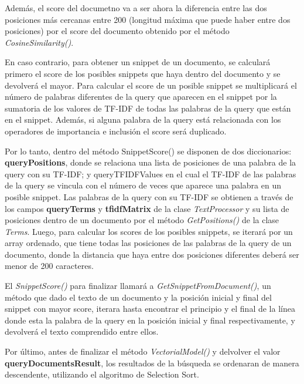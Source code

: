 \documentclass[a4paper,12pt]{report}
\begin{document}
Además, el score del documetno va a ser ahora la diferencia entre las dos posiciones más cercanas
entre 200 (longitud máxima que puede haber entre dos posiciones) por el score del documento
obtenido por el método \textit{CosineSimilarity()}.

En caso contrario, para obtener un snippet de un documento, se calculará primero el score de los
posibles snippets que haya dentro del documento y se devolverá el mayor. Para calcular el score de
un posible snippet se multiplicará el número de palabras diferentes de la query que aparecen en el
snippet por la sumatoria de los valores de TF-IDF de todas las palabras de la query que están en el
snippet. Además, si alguna palabra de la query está relacionada con los operadores de importancia e
inclusión el score será duplicado.

Por lo tanto, dentro del método SnippetScore() se disponen de dos diccionarios: \textbf{queryPositions},
donde se relaciona una lista de posiciones de una palabra de la query con su TF-IDF; y
queryTFIDFValues en el cual el TF-IDF de las palabras de la query se vincula con el número de veces
que aparece una palabra en un posible snippet. Las palabras de la query con su TF-IDF se obtienen a
través de los campos \textbf{queryTerms} y \textbf{tfidfMatrix} de la clase \textit{TextProcessor} y su lista de posiciones
dentro de un documento por el método \textit{GetPositions()} de la clase \textit{Terms}. Luego, para calcular los
scores de los posibles snippets, se iterará por un array ordenado, que tiene todas las posiciones de
las palabras de la query de un documento, donde la distancia que haya entre dos posiciones
diferentes deberá ser menor de 200 caracteres.

El \textit{SnippetScore()} para finalizar llamará a \textit{GetSnippetFromDocument()}, un método que dado el texto
de un documento y la posición inicial y final del snippet con mayor score, iterara hasta encontrar el
principio y el final de la línea donde esta la palabra de la query en la posición inicial y final
respectivamente, y devolverá el texto comprendido entre ellos.

Por último, antes de finalizar el método \textit{VectorialModel()} y delvolver el valor \textbf{queryDocumentsResult},
los resultados de la búsqueda se ordenaran de manera descendente, utilizando el algoritmo de
Selection Sort.

\newpage
\end{document}
